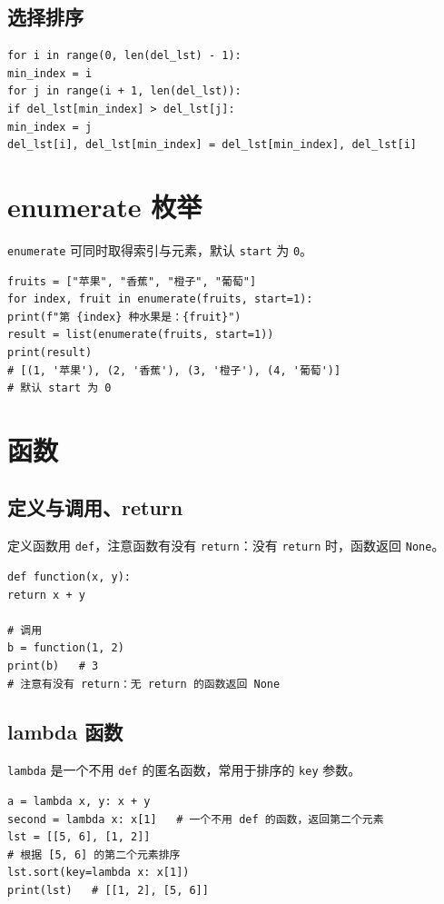 \documentclass{article}
\begin{document}
\subsection{选择排序}
\begin{lstlisting}
for i in range(0, len(del_lst) - 1):
min_index = i
for j in range(i + 1, len(del_lst)):
if del_lst[min_index] > del_lst[j]:
min_index = j
del_lst[i], del_lst[min_index] = del_lst[min_index], del_lst[i]
\end{lstlisting}

\section{enumerate 枚举}
\texttt{enumerate} 可同时取得索引与元素，默认 \texttt{start} 为 \texttt{0}。
\begin{lstlisting}
fruits = ["苹果", "香蕉", "橙子", "葡萄"]
for index, fruit in enumerate(fruits, start=1):
print(f"第 {index} 种水果是：{fruit}")
result = list(enumerate(fruits, start=1))
print(result)
# [(1, '苹果'), (2, '香蕉'), (3, '橙子'), (4, '葡萄')]
# 默认 start 为 0
\end{lstlisting}

\section{函数}
\subsection{定义与调用、return}
定义函数用 \texttt{def}，注意函数有没有 \texttt{return}：没有 \texttt{return} 时，函数返回 \texttt{None}。
\begin{lstlisting}
def function(x, y):
return x + y

# 调用
b = function(1, 2)
print(b)   # 3
# 注意有没有 return：无 return 的函数返回 None
\end{lstlisting}

\subsection{lambda 函数}
\texttt{lambda} 是一个不用 \texttt{def} 的匿名函数，常用于排序的 \texttt{key} 参数。
\begin{lstlisting}
a = lambda x, y: x + y
second = lambda x: x[1]   # 一个不用 def 的函数，返回第二个元素
lst = [[5, 6], [1, 2]]
# 根据 [5, 6] 的第二个元素排序
lst.sort(key=lambda x: x[1])
print(lst)   # [[1, 2], [5, 6]]
\end{lstlisting}
\end{document}
